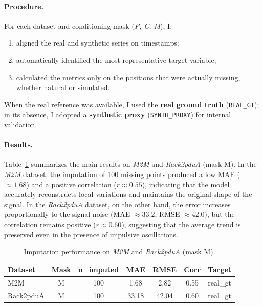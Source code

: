 \paragraph{Procedure.}
For each dataset and conditioning mask (\emph{F, C, M}), I:
\begin{enumerate}
  \item aligned the real and synthetic series on timestamps;
  \item automatically identified the most representative target variable;
  \item calculated the metrics only on the positions that were actually missing, whether natural or simulated.
\end{enumerate}
When the real reference was available, I used the \textbf{real ground truth} (\texttt{REAL\_GT}); in its absence, I adopted a \textbf{synthetic proxy} (\texttt{SYNTH\_PROXY}) for internal validation.

\paragraph{Results.}
Table~\ref{tab:imputation_metrics_results} summarizes the main results on \emph{M2M} and \emph{Rack2pduA} (mask M).  
In the \emph{M2M} dataset, the imputation of 100 missing points produced a low MAE ($\approx1.68$) and a positive correlation ($r\approx0.55$), indicating that the model accurately reconstructs local variations and maintains the original shape of the signal.  
In the \emph{Rack2pduA} dataset, on the other hand, the error increases proportionally to the signal noise (MAE $\approx33.2$, RMSE $\approx42.0$), but the correlation remains positive ($r\approx0.60$), suggesting that the average trend is preserved even in the presence of impulsive oscillations.

\begin{table}[H]
\centering
\caption{Imputation performance on \emph{M2M} and \emph{Rack2pduA} (mask M).}
\vspace{1mm}
{\small
\begin{tabular}{| l | c | c | c | c | c | c |}
\hline
\rowcolor[HTML]{F87C58}
\textbf{Dataset} & \textbf{Mask} & \textbf{n\_imputed} & \textbf{MAE} & \textbf{RMSE} & \textbf{Corr} & \textbf{Target} \\
\hline
\rowcolor[HTML]{FDE5DC}
M2M        & M & 100 & 1.68  & 2.82  & 0.55 & real\_gt \\ \hline
\rowcolor[HTML]{FFF4EE}
Rack2pduA  & M & 100 & 33.18 & 42.04 & 0.60 & real\_gt \\ \hline
\end{tabular}
}
\label{tab:imputation_metrics_results}
\end{table}

